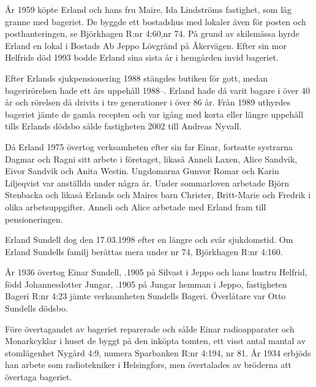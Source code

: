 År 1959 köpte Erland och hans fru Maire, Ida Lindströms fastighet, som låg granne med bageriet. De byggde ett bostadshus med lokaler även för posten och posthanteringen, se Björkhagen R:nr 4:60,nr 74.  På grund av skilsmässa hyrde Erland en lokal i Bostads Ab Jeppo Lövgränd på Åkervägen. Efter sin mor Helfrids död 1993 bodde Erland sina sista år i hemgården invid bageriet.

Efter Erlands sjukpensionering 1988 stängdes butiken för gott, medan bagerirörelsen hade ett års uppehåll 1988--. Erland hade då varit bagare i över 40 år och rörelsen då drivits i tre generationer i över 86 år. Från 1989 uthyrdes bageriet jämte de gamla recepten och var igång med korta eller längre uppehåll tills Erlands dödsbo sålde fastigheten 2002 till Andreas Nyvall.


Då Erland 1975 övertog verksamheten efter sin far Einar, fortsatte systrarna Dagmar och Ragni sitt arbete i företaget, likaså Anneli Laxen, Alice Sandvik, Eivor Sandvik och Anita Westin. Ungdomarna Gunvor Romar och Karin Liljeqvist var anställda under några år. Under sommarloven arbetade Björn Stenbacka och likaså Erlands och Maires barn Christer, Britt-Marie och Fredrik i olika arbetsuppgifter. Anneli och Alice arbetade med Erland fram till pensioneringen.

Erland Sundell dog den 17.03.1998 efter en längre och svår sjukdomstid. Om Erland Sundells familj berättas mera under nr 74, Björkhagen R:nr 4:160.


%
År 1936 övertog Einar Sundell, .1905 på Silvast i Jeppo och hans hustru Helfrid, född Johannesdotter Jungar, .1905 på Jungar hemman i Jeppo, fastigheten Bageri R:nr 4:23 jämte verksamheten Sundells Bageri. Överlåtare var Otto Sundells dödsbo.

Före övertagandet av bageriet reparerade och sålde Einar radioapparater och Monarkcyklar i huset de byggt på den inköpta tomten, ett visst antal mantal av stomlägenhet Nygård 4:9, numera Sparbanken R:nr 4:194, nr 81. År 1934 erbjöds han arbete som radiotekniker i Helsingfors, men övertalades av bröderna att övertaga bageriet.

